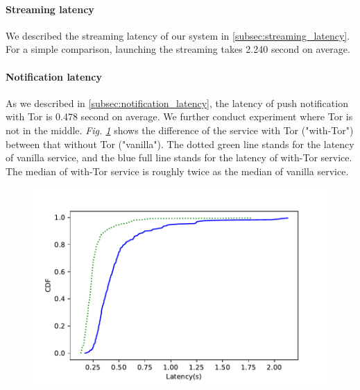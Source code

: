 \paragraph{Streaming latency} 

We described the streaming latency of our system in \ref{subsec:streaming_latency}. For a simple comparison, launching the streaming takes 2.240 second on average.

\paragraph{Notification latency}

As we described in \ref{subsec:notification_latency}, the latency of push notification with Tor is 0.478 second on average. We further conduct experiment where Tor is not in the middle. \textit{Fig. \ref{fig:notificationlatency_wTor_vs_vanilla}} shows the difference of the service with Tor ("with-Tor") between that without Tor ("vanilla"). The dotted green line stands for the latency of vanilla service, and the blue full line stands for the latency of with-Tor service. The median of with-Tor service is roughly twice as the median of vanilla service.

\begin{figure}
	\includegraphics[width=\linewidth]{plot_push_tor_vs_vanilla.pdf}
	\caption{}
	\label{fig:notificationlatency_wTor_vs_vanilla}
\end{figure}